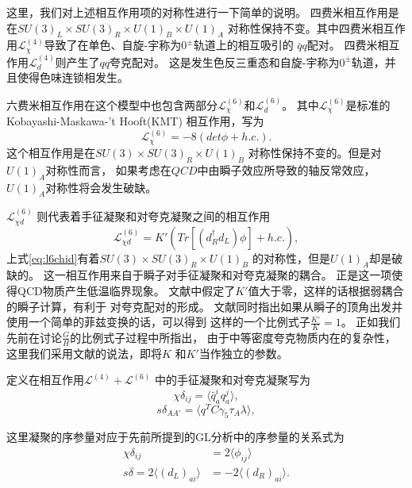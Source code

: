 这里，我们对上述相互作用项的对称性进行一下简单的说明。
四费米相互作用是在$SU(3)_L\times SU(3)_R \times U(1)_B \times U(1)_A$
对称性保持不变。其中四费米相互作用$\mathcal{L}^{(4)}_\chi$导致了在单色、自旋-宇称为$0^{\pm}$轨道上的相互吸引的
$\bar{q}q$配对。
四费米相互作用$\mathcal{L}^{(4)}_d$则产生了$qq$夸克配对。
这是发生色反三重态和自旋-宇称为$0^{\pm}$轨道，并且使得色味连锁相发生。

六费米相互作用在这个模型中也包含两部分$\mathcal{L}^{(6)}_\chi$和$\mathcal{L}^{(6)}_d$。
其中$\mathcal{L}^{(6)}_\chi$是标准的Kobayashi-Maskawa-'t Hooft(KMT)
相互作用，写为
\begin{equation}
\label{eq:l6chi}
    \mathcal{L}^{(6)}_\chi = -8(det\phi + h.c.).
\end{equation}
这个相互作用是在$SU(3)\times SU(3)_R \times U(1)_B$
对称性保持不变的。但是对$U(1)_A$对称性而言，
如果考虑在$QCD$中由瞬子效应所导致的轴反常效应，
$U(1)_A$对称性将会发生破缺。

$\mathcal{L}^{(6)}_{\chi d}$
则代表着手征凝聚和对夸克凝聚之间的相互作用
\begin{equation}
\label{eq:l6chid}
    \mathcal{L}^{(6)}_{\chi d}
= K'(Tr[(d^\dagger_Rd_L)\phi] + h.c.),
\end{equation}
上式\ref{eq:l6chid}有着$SU(3)\times SU(3)_R \times U(1)_B$
的对称性，但是$U(1)_A$却是破缺的。
这一相互作用来自于瞬子对手征凝聚和对夸克凝聚的耦合。
正是这一项使得QCD物质产生低温临界现象。
文献\cite{}中假定了$K'$值大于零，这样的话根据弱耦合的瞬子计算，有利于
对夸克配对的形成。
文献同时指出如果从瞬子的顶角出发并使用一个简单的菲兹变换的话，可以得到
这样的一个比例式子$\frac{K'}{K} =1$。
正如我们先前在讨论$\frac{G}{H}$的比例式子过程中所指出，
由于中等密度夸克物质内在的复杂性，这里我们采用文献的说法，即将$K$
和$K'$当作独立的参数。

定义在相互作用$\mathcal{L}^{(4)} + \mathcal{L}^{(6)}$
中的手征凝聚和对夸克凝聚写为
\begin{equation}
    \chi \delta_{ij} = \langle\bar{q}^i_a q_a^j\rangle,
\end{equation}
\begin{equation}
    s\delta_{AA'} = \langle q^T C\gamma_5\tau_A\lambda\rangle,
\end{equation}

这里凝聚的序参量对应于先前所提到的GL分析中的序参量的关系式为
\begin{eqnarray}
\chi \delta_{ij} &= 2\langle\phi_{ij}\rangle \\
s\delta = 2\langle(d_L)_{ai}\rangle &= -2\langle(d_R)_{ai}\rangle .
\end{eqnarray}

